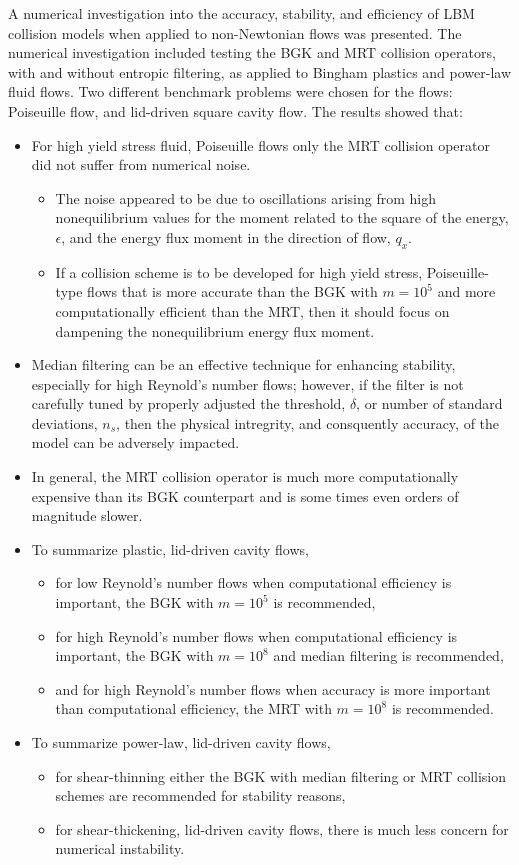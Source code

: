\documentclass[pdftex,ms]{pittetd}
\begin{document}
A numerical investigation into the accuracy, stability, and efficiency of LBM collision models when applied to non-Newtonian flows was presented.
The numerical investigation included testing the BGK and MRT collision operators, with and without entropic filtering, as applied to Bingham plastics and power-law fluid flows.
Two different benchmark problems were chosen for the flows: Poiseuille flow, and lid-driven square cavity flow.
The results showed that:
\begin{itemize}
  \item For high yield stress fluid, Poiseuille flows only the MRT collision operator did not suffer from numerical noise.
  \begin{itemize}
      \item The noise appeared to be due to oscillations arising from high nonequilibrium values for the moment related to the square of the energy, $\epsilon$, and the energy flux moment in the direction of flow, $q_x$.
      \item If a collision scheme is to be developed for high yield stress, Poiseuille-type flows that is more accurate than the BGK with $m = 10^5$ and more computationally efficient than the MRT, then it should focus on dampening the nonequilibrium energy flux moment.
    \end{itemize}
  \item Median filtering can be an effective technique for enhancing stability, especially for high Reynold's number flows; however, if the filter is not carefully tuned by properly adjusted the threshold, $\delta$, or number of standard deviations, $n_s$, then the physical intregrity, and consquently accuracy, of the model can be adversely impacted.
  \item In general, the MRT collision operator is much more computationally expensive than its BGK counterpart and is some times even orders of magnitude slower.
  \item To summarize plastic, lid-driven cavity flows,
    \begin{itemize}
  \item for low Reynold's number flows when computational efficiency is important, the BGK with $m = 10^5$ is recommended,
  \item for high Reynold's number flows when computational efficiency is important, the BGK with $m = 10^8$ and median filtering is recommended,
  \item and for high Reynold's number flows when accuracy is more important than computational efficiency, the MRT with $m = 10^8$ is recommended.
    \end{itemize}
  \item To summarize power-law, lid-driven cavity flows,
    \begin{itemize}
  \item for shear-thinning either the BGK with median filtering or MRT collision schemes are recommended for stability reasons,
  \item for shear-thickening, lid-driven cavity flows, there is much less concern for numerical instability.
    \end{itemize}
\end{itemize}
\end{document}
